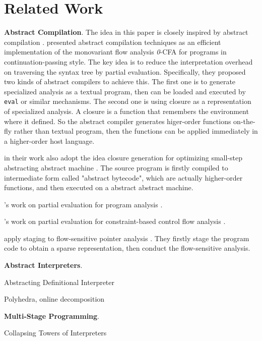 \section{Related Work}

\textbf{Abstract Compilation}. The idea in this paper is closely inspired by 
abstract compilation \cite{Boucher:1996:ACN:647473.727587}.
\citeauthor{Boucher:1996:ACN:647473.727587} presented abstract compilation
techniques as an efficient implementation of the monovariant flow analysis 
\textit{0}-CFA for programs in continuation-passing style. The key idea is to 
reduce the interpretation overhead on traversing the syntax tree by partial evaluation.
Specifically, they proposed two kinds of abstract compilers to achieve this. 
The first one is to generate specialized analysis as a textual program, then 
can be loaded and executed by \texttt{eval} or similar mechanisms. The second 
one is using closure as a representation of specialized analysis. 
A closure is a function that remembers the environment where it defined. So the 
abstract compiler generates higer-order functions on-the-fly rather than textual 
program, then the functions can be applied immediately in a higher-order host language.

\citeauthor{Johnson:2013:OAA:2500365.2500604} in their work also adopt the 
idea closure generation for optimizing small-step abstracting abstract machine
\cite{Johnson:2013:OAA:2500365.2500604}. The source program is firstly compiled
to intermediate form called "abstract bytecode", which are actually higher-order functions, 
and then executed on a abstract abstract machine.

\citeauthor{damian1999partial}'s work on partial evaluation for program analysis \cite{damian1999partial}.

\citeauthor{amtoft1999partial}'s work on partial evaluation for constraint-based 
control flow analysis \cite{amtoft1999partial}.

\citeauthor{hardekopf2011flow} apply staging to flow-sensitive pointer analysis \cite{hardekopf2011flow}. 
They firstly stage the program code to obtain a sparse representation, then conduct
the flow-sensitive analysis. 

\textbf{Abstract Interpreters}. 

Abstracting Definitional Interpreter \cite{darais2017abstracting}

Polyhedra, online decomposition

\textbf{Multi-Stage Programming}.

Collapsing Towers of Interpreters\cite{Amin:2017:CTI:3177123.3158140}
